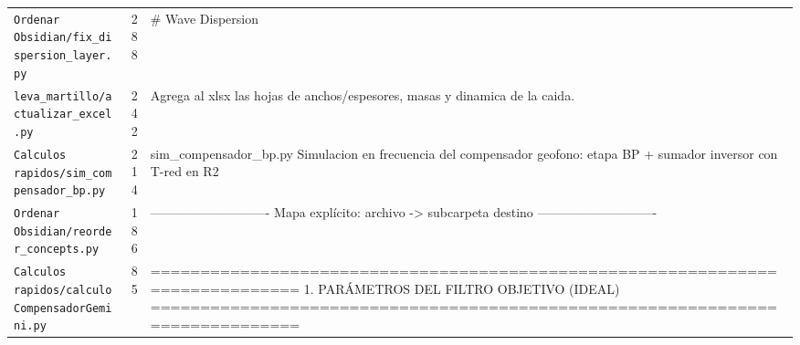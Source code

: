 \begin{longtable}{@{}p{5.4cm} r p{8.6cm}@{}}
\texttt{\scriptsize Ordenar Obsidian/fix\_dispersion\_layer.py} & 288 & \# Wave Dispersion \\
\texttt{\scriptsize leva\_martillo/actualizar\_excel.py} & 242 & Agrega al xlsx las hojas de anchos/espesores, masas y dinamica de la caida. \\
\texttt{\scriptsize Calculos rapidos/sim\_compensador\_bp.py} & 214 & sim\_compensador\_bp.py Simulacion en frecuencia del compensador geofono: etapa BP  +  sumador inversor con T-red en R2 \\
\texttt{\scriptsize Ordenar Obsidian/reorder\_concepts.py} & 186 & ---------------------------- Mapa explícito: archivo -> subcarpeta destino ---------------------------- \\
\texttt{\scriptsize Calculos rapidos/calculoCompensadorGemini.py} & 85 & ============================================================================== 1. PARÁMETROS DEL FILTRO OBJETIVO (IDEAL) ============================================================================== \\
\end{longtable}
\normalsize

